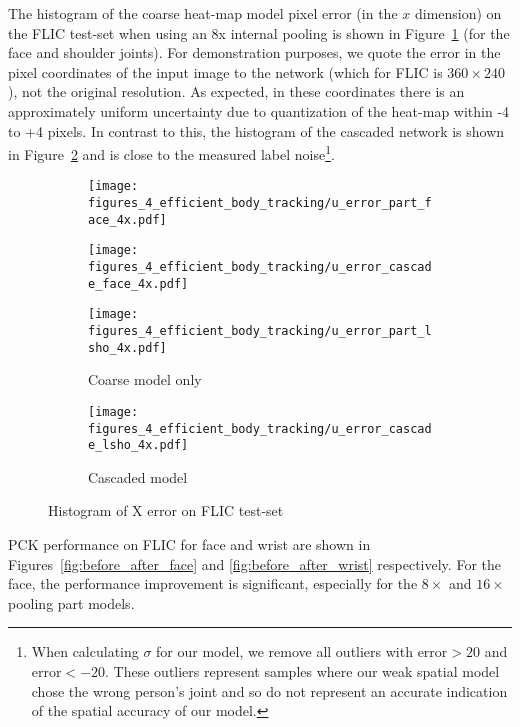 The histogram of the coarse heat-map model pixel error (in the $x$ dimension) on the FLIC test-set when using an 8x internal pooling is shown in Figure~\ref{fig:histogram_before} (for the face and shoulder joints). For demonstration purposes, we quote the error in the pixel coordinates of the input image to the network (which for FLIC is $360\times240$), not the original resolution. As expected, in these coordinates there is an approximately uniform uncertainty due to quantization of the heat-map within -4 to +4 pixels. In contrast to this, the histogram of the cascaded network is shown in Figure~\ref{fig:histogram_after} and is close to the measured label noise\footnote{When calculating $\sigma$ for our model, we remove all outliers with $\text{error}>20$ and $\text{error}<-20$. These outliers represent samples where our weak spatial model chose the wrong person's joint and so do not represent an accurate indication of the spatial accuracy of our model.}.

\begin{figure}[ht]
  \centering
  \begin{subfigure}[b]{0.4\linewidth}
        \texttt{[image: figures\_4\_efficient\_body\_tracking/u\_error\_part\_face\_4x.pdf]}
  \end{subfigure}
  \begin{subfigure}[b]{0.4\linewidth}
        \texttt{[image: figures\_4\_efficient\_body\_tracking/u\_error\_cascade\_face\_4x.pdf]}
  \end{subfigure}
  \begin{subfigure}[b]{0.4\linewidth}
        \texttt{[image: figures\_4\_efficient\_body\_tracking/u\_error\_part\_lsho\_4x.pdf]}
        \caption{Coarse model only}
        \label{fig:histogram_before}
  \end{subfigure}
  \begin{subfigure}[b]{0.4\linewidth}
        \texttt{[image: figures\_4\_efficient\_body\_tracking/u\_error\_cascade\_lsho\_4x.pdf]}
        \caption{Cascaded model}
        \label{fig:histogram_after}
  \end{subfigure}
  \caption{Histogram of X error on FLIC test-set}
  \label{fig:histogram}
\end{figure}

PCK performance on FLIC for face and wrist are shown in Figures~\ref{fig:before_after_face} and \ref{fig:before_after_wrist} respectively. For the face, the performance improvement is significant, especially for the $8\times$ and $16\times$ pooling part models.

